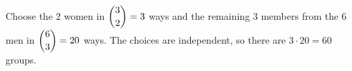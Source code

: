Choose the $2$ women in $\dbinom32=3$ ways and the remaining $3$ members from the $6$ men in $\dbinom63=20$ ways. The choices are independent, so there are $3\cdot20=\boxed{60}$ groups.
